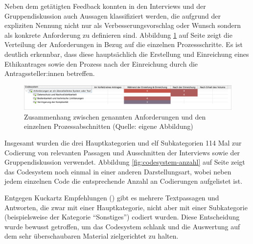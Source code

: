 \documentclass[a4paper,12pt,twoside]{scrreprt}
\begin{document}
Neben dem getätigten Feedback konnten in den Interviews und der Gruppendiskussion auch Aussagen klassifiziert werden, die aufgrund der expliziten Nennung nicht nur als Verbesserungsvorschlag oder Wunsch sondern als konkrete Anforderung zu definieren sind. Abbildung \ref{fig:anforderungen-x-prozess} auf Seite \pageref{fig:anforderungen-x-prozess} zeigt die Verteilung der Anforderungen in Bezug auf die einzelnen Prozessschritte. Es ist deutlich erkennbar, dass diese hauptsächlich die Erstellung und Einreichung eines Ethikantrages sowie den Prozess nach der Einreichung durch die Antragssteller:innen betreffen.

\begin{figure}[ht]
    \centering
    \includegraphics[width=\linewidth]{thesis/images/Luidold_Anforderungen-Prozess.png}
    \caption[Zusammenhang zwischen genannten Anforderungen und den einzelnen Prozessabschnitten]{Zusammenhang zwischen genannten Anforderungen und den einzelnen Prozessabschnitten (Quelle: eigene Abbildung)}
    \label{fig:anforderungen-x-prozess}
\end{figure}

Insgesamt wurden die drei Hauptkategorien und elf Subkategorien 114 Mal zur Codierung von relevanten Passagen und Ausschnitten der Interviews sowie der Gruppendiskussion verwendet. Abbildung \ref{fig:codesystem-anzahl} auf Seite \pageref{fig:codesystem-anzahl} zeigt das Codesystem noch einmal in einer anderen Darstellungsart, wobei neben jedem einzelnen Code die entsprechende Anzahl an Codierungen aufgelistet ist.

Entgegen Kuckartz Empfehlungen (\cite[108]{kuckartz_qualitative_2018}) gibt es mehrere Textpassagen und Antworten, die zwar mit einer Hauptkategorie, nicht aber mit einer Subkategorie (beispielsweise der Kategorie \enquote{Sonstiges}) codiert wurden. Diese Entscheidung wurde bewusst getroffen, um das Codesystem schlank und die Auswertung auf dem sehr überschaubaren Material zielgerichtet zu halten.
\end{document}
